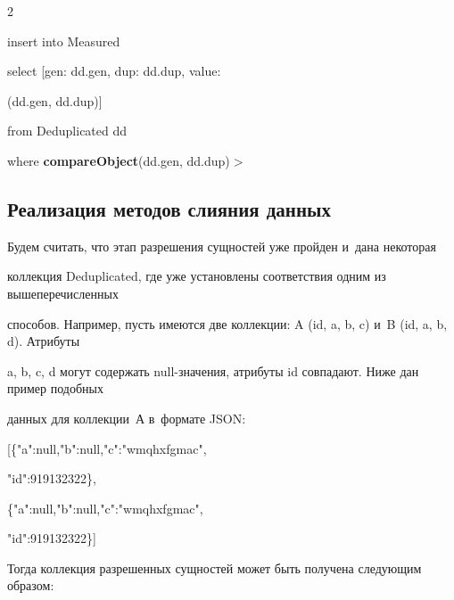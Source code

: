 \begin{multicols}{2}
{\noindent

  insert into Measured



\noindent

  select [gen: dd.gen, dup: dd.dup, value:



  \noindent

  (dd.gen, dd.dup)]



\noindent

  from Deduplicated dd



\noindent

  where {\textbf{compareObject}}(dd.gen, dd.dup)\;$>$

  }



  \subsection{Реализация методов слияния данных}



     Будем считать, что этап разрешения сущностей уже пройден и~дана некоторая

коллекция Deduplicated, где уже установлены соответствия одним из вышеперечисленных

способов. Например, пусть имеются две коллекции: A (id, a, b, c) и~B (id, a, b, d). Атрибуты

a, b, c, d могут содержать null-значения, атрибуты id совпадают. Ниже дан пример подобных

данных для коллекции~А в~формате JSON:



{\sf

\noindent

  [\{"a":null,"b":null,"c":"wmqhxfgmac",



  \noindent

  "id":919132322\},



\noindent

  \{"a":null,"b":null,"c":"wmqhxfgmac",



  \noindent

  "id":919132322\}]

}

  Тогда коллекция разрешенных сущностей может быть получена следующим образом:




\end{multicols}
